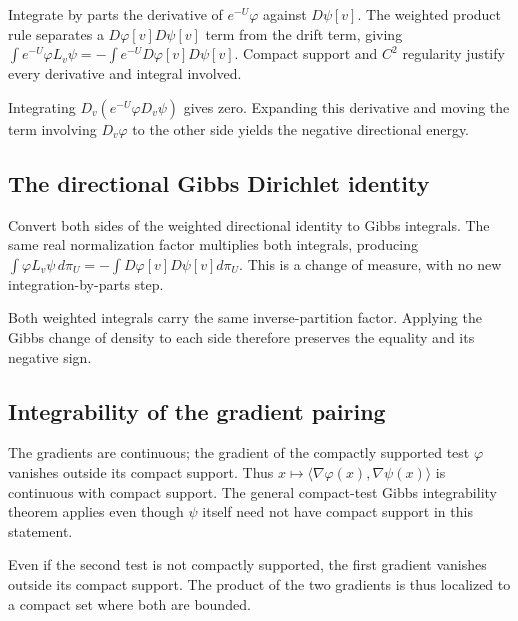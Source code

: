 \documentclass[11pt,a4paper]{report}
\begin{document}
Integrate by parts the derivative of \(e^{-U}\varphi\) against \(D\psi[v]\). The weighted product rule separates a \(D\varphi[v]D\psi[v]\) term from the drift term, giving \(\int e^{-U}\varphi L_v\psi=-\int e^{-U}D\varphi[v]D\psi[v]\). Compact support and \(C^2\) regularity justify every derivative and integral involved.



Integrating \(D_v(e^{-U}\varphi D_v\psi)\) gives zero. Expanding this derivative and moving the term involving \(D_v\varphi\) to the other side yields the negative directional energy.

\subsection{\texorpdfstring{The directional Gibbs Dirichlet identity}{The directional Gibbs Dirichlet identity}}
\label{report-step-UnadjustedLangevin-GeneratorDirichlet-lean-3}


Convert both sides of the weighted directional identity to Gibbs integrals. The same real normalization factor multiplies both integrals, producing \(\int\varphi L_v\psi\,d\pi_U=-\int D\varphi[v]D\psi[v]d\pi_U\). This is a change of measure, with no new integration-by-parts step.



Both weighted integrals carry the same inverse-partition factor. Applying the Gibbs change of density to each side therefore preserves the equality and its negative sign.

\subsection{\texorpdfstring{Integrability of the gradient pairing}{Integrability of the gradient pairing}}
\label{report-step-UnadjustedLangevin-GeneratorDirichlet-lean-4}


The gradients are continuous; the gradient of the compactly supported test \(\varphi\) vanishes outside its compact support. Thus \(x\mapsto\langle\nabla\varphi(x),\nabla\psi(x)\rangle\) is continuous with compact support. The general compact-test Gibbs integrability theorem applies even though \(\psi\) itself need not have compact support in this statement.



Even if the second test is not compactly supported, the first gradient vanishes outside its compact support. The product of the two gradients is thus localized to a compact set where both are bounded.
\end{document}
